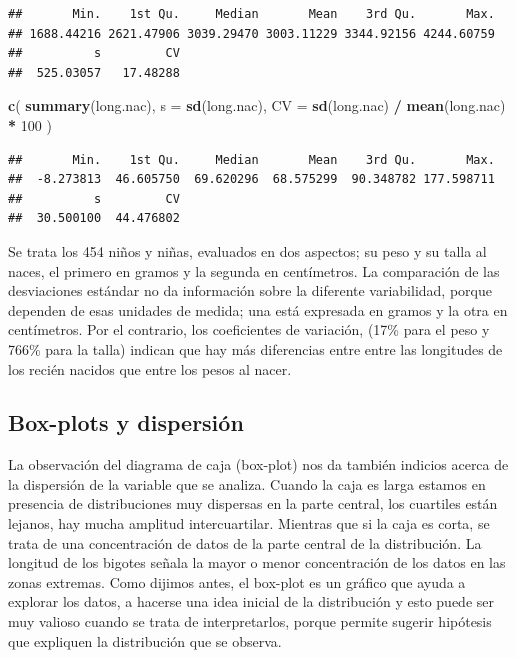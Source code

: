 \documentclass[]{book}
\newenvironment{Shaded}{\begin{snugshade}}{\end{snugshade}}
\newcommand{\DataTypeTok}[1]{\textcolor[rgb]{0.13,0.29,0.53}{#1}}
\newcommand{\DecValTok}[1]{\textcolor[rgb]{0.00,0.00,0.81}{#1}}
\newcommand{\KeywordTok}[1]{\textcolor[rgb]{0.13,0.29,0.53}{\textbf{#1}}}
\newcommand{\NormalTok}[1]{#1}
\newcommand{\OperatorTok}[1]{\textcolor[rgb]{0.81,0.36,0.00}{\textbf{#1}}}
\newcommand{\StringTok}[1]{\textcolor[rgb]{0.31,0.60,0.02}{#1}}
\begin{document}
\begin{verbatim}
##       Min.    1st Qu.     Median       Mean    3rd Qu.       Max. 
## 1688.44216 2621.47906 3039.29470 3003.11229 3344.92156 4244.60759 
##          s         CV 
##  525.03057   17.48288
\end{verbatim}

\begin{Shaded}
\begin{Highlighting}[]
\KeywordTok{c}\NormalTok{(}
  \KeywordTok{summary}\NormalTok{(long.nac),}
  \DataTypeTok{s =} \KeywordTok{sd}\NormalTok{(long.nac),}
  \DataTypeTok{CV =} \KeywordTok{sd}\NormalTok{(long.nac) }\OperatorTok{/}\StringTok{ }\KeywordTok{mean}\NormalTok{(long.nac) }\OperatorTok{*}\StringTok{ }\DecValTok{100}
\NormalTok{)}
\end{Highlighting}
\end{Shaded}

\begin{verbatim}
##       Min.    1st Qu.     Median       Mean    3rd Qu.       Max. 
##  -8.273813  46.605750  69.620296  68.575299  90.348782 177.598711 
##          s         CV 
##  30.500100  44.476802
\end{verbatim}

Se trata los 454 niños y niñas, evaluados en dos aspectos; su
peso y su talla al naces, el primero en gramos y la segunda en centímetros. La comparación de las desviaciones estándar no da
información sobre la diferente variabilidad, porque dependen de esas
unidades de medida; una está expresada en gramos y la otra en centímetros. Por el contrario, los coeficientes de variación,
(17\% para el peso y 766\% para la talla) indican que hay más
diferencias entre entre las longitudes de los recién nacidos que entre los pesos al nacer.

\hypertarget{box-plots-y-dispersion}{%
\subsection{Box-plots y dispersión}\label{box-plots-y-dispersion}}

La observación del diagrama de caja (box-plot) nos da también indicios acerca de la dispersión de la variable que se analiza. Cuando la caja es larga estamos en presencia de distribuciones muy dispersas en la parte central, los cuartiles están lejanos, hay mucha amplitud intercuartilar.
Mientras que si la caja es corta, se trata de una concentración de datos
de la parte central de la distribución. La longitud de los bigotes
señala la mayor o menor concentración de los datos en las zonas
extremas. Como dijimos antes, el box-plot es un gráfico que ayuda a
explorar los datos, a hacerse una idea inicial de la distribución y esto puede ser muy valioso cuando se trata de interpretarlos, porque permite sugerir hipótesis que expliquen la distribución que se observa.
\end{document}
